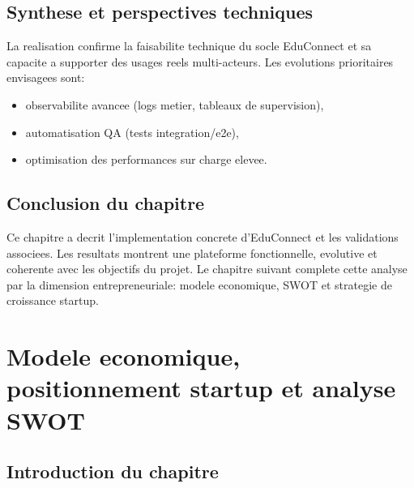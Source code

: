﻿\documentclass[12pt,a4paper,oneside]{report}
\begin{document}
\section{Synthese et perspectives techniques}

La realisation confirme la faisabilite technique du socle EduConnect et sa capacite a supporter des usages reels multi-acteurs. Les evolutions prioritaires envisagees sont:
\begin{itemize}
  \item observabilite avancee (logs metier, tableaux de supervision),
  \item automatisation QA (tests integration/e2e),
  \item optimisation des performances sur charge elevee.
\end{itemize}

\section{Conclusion du chapitre}

Ce chapitre a decrit l'implementation concrete d'EduConnect et les validations associees. Les resultats montrent une plateforme fonctionnelle, evolutive et coherente avec les objectifs du projet. Le chapitre suivant complete cette analyse par la dimension entrepreneuriale: modele economique, SWOT et strategie de croissance startup.


\chapter{Modele economique, positionnement startup et analyse SWOT}

\section{Introduction du chapitre}
\end{document}
